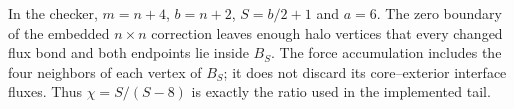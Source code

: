 In the checker, $m=n+4$, $b=n+2$, $S=b/2+1$ and $a=6$.
The zero boundary of the embedded $n\times n$ correction leaves enough
halo vertices that every changed flux bond and both endpoints lie inside
$B_S$. The force accumulation includes the four neighbors of each
vertex of $B_S$; it does not discard its core--exterior interface fluxes.
Thus $\chi=S/(S-8)$ is exactly the ratio used in the implemented tail.
